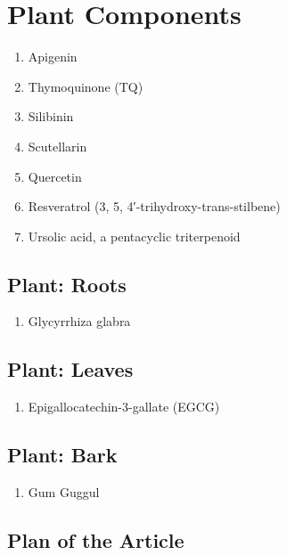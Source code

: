 \section{Plant Components}

\begin{enumerate}
\item Apigenin
\item Thymoquinone (TQ)
\item Silibinin
\item Scutellarin 
\item Quercetin
\item Resveratrol (3, 5, 4′-trihydroxy-trans-stilbene)
\item Ursolic acid, a pentacyclic triterpenoid
\end{enumerate}

\subsection{Plant: Roots}

\begin{enumerate}
\item Glycyrrhiza glabra
\end{enumerate}


\subsection{Plant: Leaves}

\begin{enumerate}
\item Epigallocatechin-3-gallate (EGCG)
\end{enumerate}


\subsection{Plant: Bark}

\begin{enumerate}
\item Gum Guggul
\end{enumerate}


\subsection{Plan of the Article}

\begin{enumerate}
\end{enumerate}



